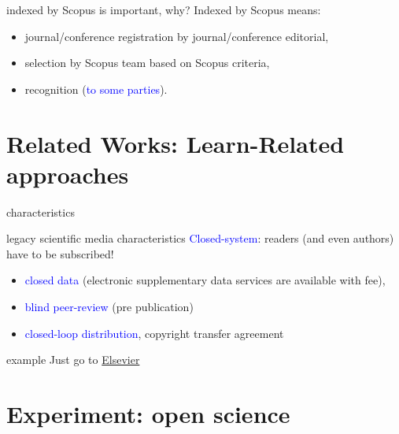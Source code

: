 \documentclass[10pt]{beamer}
\begin{document}
\begin{frame}{indexed by Scopus is important, why?}
	Indexed by Scopus means:
	\begin{itemize}
    \item journal/conference registration by journal/conference editorial, 
    \item selection by Scopus team based on Scopus criteria, 
    \item recognition (\textcolor{blue}{to some parties}).
	\end{itemize}
\end{frame}

\section{Related Works: Learn-Related approaches}

\begin{frame}{characteristics}
    \begin{exampleblock}{legacy scientific media characteristics}
	\textcolor{blue}{Closed-system}: readers (and even authors) have to be subscribed!
	\begin{itemize}
    \item \textcolor{blue}{closed data} (electronic supplementary data services are available with fee),
    \item \textcolor{blue}{blind peer-review} (pre publication)
    \item \textcolor{blue}{closed-loop distribution}, copyright transfer agreement
    \end{itemize}
    \end{exampleblock}
\end{frame}
  
\begin{frame}{example}
	Just go to \href{www.elsevier.com}{Elsevier}
\end{frame}

\section{Experiment: open science}
\end{document}
